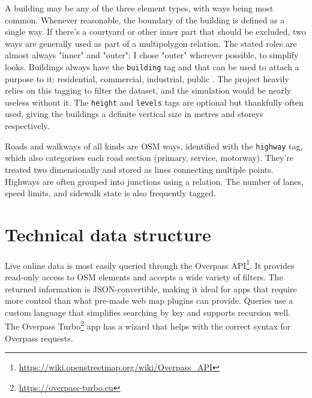 A building may be any of the three element types, with ways being most common. Whenever reasonable, the boundary of the building is defined as a single way. If there's a courtyard or other inner part that should be excluded, two ways are generally used as part of a multipolygon relation. The stated roles are almost always "inner" and "outer"; I chose "outer" wherever possible, to simplify looks. Buildings always have the \verb|building| tag and that can be used to attach a purpose to it: residential, commercial, industrial, public \etc. The project heavily relies on this tagging to filter the dataset, and the simulation would be nearly useless without it. The \verb|height| and \verb|levels| tags are optional but thankfully often used, giving the buildings a definite vertical size in metres and storeys respectively.

Roads and walkways of all kinds are OSM ways, identified with the \verb|highway| tag, which also categorises each road section (\eg primary, service, motorway). They're treated two dimensionally and stored as lines connecting multiple points. Highways are often grouped into junctions using a relation. The number of lanes, speed limits, and sidewalk state is also frequently tagged.


\section{Technical data structure}

Live online data is most easily queried through the Overpass API\footnote{\url{https://wiki.openstreetmap.org/wiki/Overpass_API}}. It provides read-only access to OSM elements and accepts a wide variety of filters. The returned information is JSON-convertible, making it ideal for apps that require more control than what pre-made web map plugins can provide. Queries use a custom language that simplifies searching by key and supports recursion well. The Overpass Turbo\footnote{\url{https://overpass-turbo.eu}} app has a wizard that helps with the correct syntax for Overpass requests.


